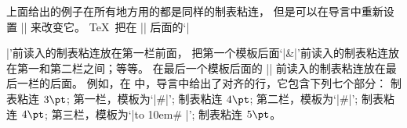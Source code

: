 {%
\danger 上面给出的例子在所有地方用的都是同样的制表粘连，
但是可以在导言中重新设置 |\tabskip| 来改变它。%
 \TeX\ 把在 |\halign| 后面的`|{|'前读入的制表粘连放在第一栏前面，
把第一个模板后面`|&|'前读入的制表粘连放在第一和第二栏之间；等等。%
在最后一个模板后面的 |\cr| 前读入的制表粘连放在最后一栏的后面。%
例如，在
\begintt
\tabskip=3pt
\endtt
中，导言中给出了对齐的行，它包含下列七个部分：
\begindisplay
制表粘连 $3\pt$;\cr
第一栏，模板为`|\hfil#|';\cr
制表粘连 $4\pt$;\cr
第二栏，模板为`|#\hfil|';\cr
制表粘连 $4\pt$;\cr
第三栏，模板为`|\hbox to 10em{\hss# \hss}|';\cr
制表粘连 $5\pt$。\cr
\enddisplay

}}
